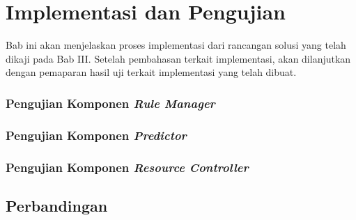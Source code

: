 \chapter{Implementasi dan Pengujian}
Bab ini akan menjelaskan proses implementasi dari rancangan solusi yang telah dikaji pada Bab III. Setelah pembahasan terkait implementasi, akan dilanjutkan dengan pemaparan hasil uji terkait implementasi yang telah dibuat.








\subsection{Pengujian Komponen \textit{Rule Manager}}
\subsection{Pengujian Komponen \textit{Predictor}}
\subsection{Pengujian Komponen \textit{Resource Controller}}


\section{Perbandingan}
